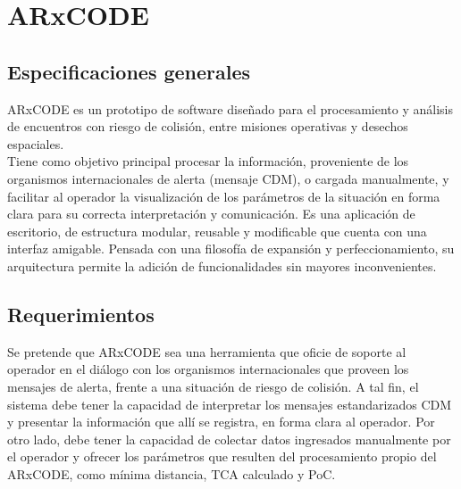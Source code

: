\chapter{ARxCODE}
\label{chap:arxcode} 

\section{Especificaciones generales}

ARxCODE es un prototipo de software dise\~nado para el procesamiento y an\'alisis de encuentros con riesgo de colisi\'on, entre misiones operativas y desechos espaciales.\\

Tiene como objetivo principal procesar la informaci\'on, proveniente de los organismos internacionales de alerta (mensaje CDM), o cargada manualmente, y facilitar al operador la visualizaci\'on de los par\'ametros de la situaci\'on en forma clara para su correcta interpretaci\'on y comunicaci\'on.
Es una aplicaci\'on de escritorio, de estructura modular, reusable y modificable que cuenta con una interfaz amigable.
Pensada con una filosof\'ia de expansi\'on y perfeccionamiento, su arquitectura permite la adici\'on de funcionalidades sin mayores inconvenientes.\\


\section{Requerimientos}\label{sec:requerimientos}

Se pretende que ARxCODE sea una herramienta que oficie de soporte al operador en el di\'alogo con los organismos internacionales que proveen los mensajes de alerta, frente a una situaci\'on de riesgo de colisi\'on. A tal fin, el sistema debe tener la capacidad de interpretar los mensajes estandarizados CDM y presentar la informaci\'on que all\'i se registra, en forma clara al operador.
Por otro lado, debe tener la capacidad de colectar datos ingresados manualmente por el operador y ofrecer los par\'ametros que resulten del procesamiento propio del ARxCODE, como m\'inima distancia, TCA calculado y PoC.\\

